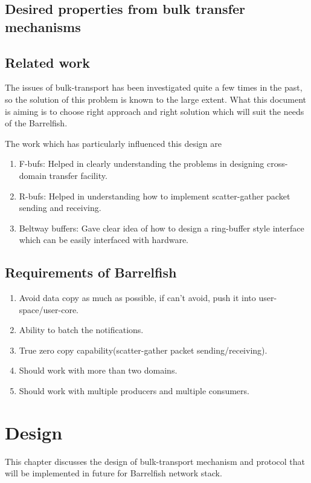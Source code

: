 \documentclass[a4paper,twoside]{report} %
\begin{document}
\section{Desired properties from bulk transfer mechanisms}

\section{Related work}
The issues of bulk-transport has been investigated quite a few times
in the past, so the solution of this problem is known to the large
extent.  What this document is aiming is to choose right approach and
right solution which will suit the needs of the Barrelfish.


The work which has particularly influenced this design are
\begin{enumerate}
  \item F-bufs: Helped in clearly understanding the problems in
  designing cross-domain transfer facility.
  \item R-bufs: Helped in understanding how to implement
  scatter-gather packet sending and receiving.
  \item Beltway buffers: Gave clear idea of how to design a
  ring-buffer style interface which can be easily interfaced with
  hardware. 
\end{enumerate}

\section{Requirements of Barrelfish}

\begin{enumerate}
  \item Avoid data copy as much as possible, if can't avoid,
  push it into user-space/user-core.
  \item Ability to batch the notifications.
  \item True zero copy capability(scatter-gather packet
  sending/receiving).
  \item Should work with more than two domains.
  \item Should work with multiple producers and multiple consumers.
\end{enumerate}

\chapter{Design}
This chapter discusses the design of bulk-transport mechanism and
protocol that will be implemented in future for Barrelfish network
stack.
\end{document}
